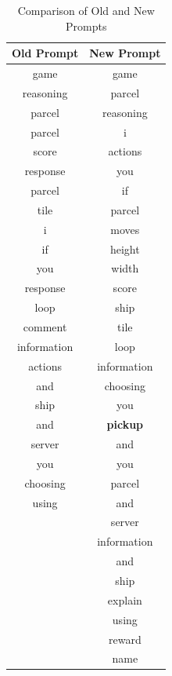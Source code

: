 \begin{table}[ht]
  \centering
  \begin{tabular}{|c|c|}
    \hline
    \textbf{Old Prompt} & \textbf{New Prompt} \\
    \hline
    game                & game                \\
    reasoning           & parcel              \\
    parcel              & reasoning           \\
    parcel              & i                   \\
    score               & actions             \\
    response            & you                 \\
    parcel              & if                  \\
    tile                & parcel              \\
    i                   & moves               \\
    if                  & height              \\
    you                 & width               \\
    response            & score               \\
    loop                & ship                \\
    comment             & tile                \\
    information         & loop                \\
    actions             & information         \\
    and                 & choosing            \\
    ship                & you                 \\
    and                 & \textbf{pickup}     \\
    server              & and                 \\
    you                 & you                 \\
    choosing            & parcel              \\
    using               & and                 \\
                        & server              \\
                        & information         \\
                        & and                 \\
                        & ship                \\
                        & explain             \\
                        & using               \\
                        & reward              \\
                        & name                \\
    \hline
  \end{tabular}
  \caption{Comparison of Old and New Prompts}
  \label{tab:prompt_comparison}
\end{table}

